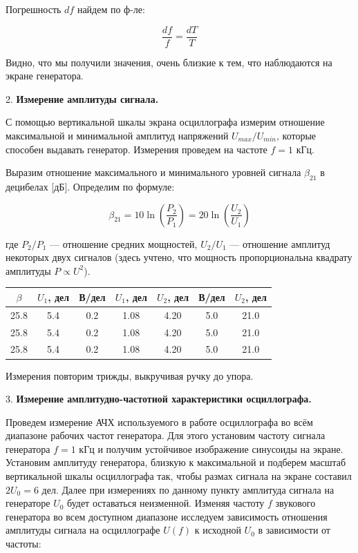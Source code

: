 \documentclass[14pt]{article}
\begin{document}
Погрешность $df$ найдем по ф-ле: 

$$\frac{df}{f} = \frac{dT}{T}$$

Видно, что мы получили значения, очень близкие к тем, что наблюдаются на экране генератора.

\vspace{0.5cm}
2. \textbf{Измерение амплитуды сигнала.} 

С помощью вертикальной шкалы экрана осциллографа измерим отношение максимальной и минимальной амплитуд напряжений $U_{max}/U_{min}$, которые способен выдавать генератор. Измерения проведем на частоте $f = 1$ кГц.

Выразим отношение максимального и минимального уровней сигнала $\beta_{21}$ в децибелах [дБ]. Определим по формуле:

$$\beta_{21} = 10 \ln\left(\frac{P_2}{P_1}\right) = 20 \ln\left(\frac{U_2}{U_1}\right)$$

где $P_2/P_1$ — отношение средних мощностей, $U_2/U_1$ — отношение амплитуд некоторых двух сигналов (здесь учтено, что мощность пропорциональна квадрату амплитуды $P \propto U^2$).


\begin{center}
\begin{tabular}{|c|c|c|c|c|c|c|}
\hline
$\beta$		&	$U_1$, дел	&	В/дел	&	$U_1$, дел	&	$U_2$, дел	&	В/дел	&	$U_2$, дел\\
\hline
25.8		&	5.4			&	0.2		&	1.08		&	4.20		&	5.0		&	21.0\\
\hline
25.8		&	5.4			&	0.2		&	1.08		&	4.20		&	5.0		&	21.0\\
\hline
25.8		&	5.4			&	0.2		&	1.08		&	4.20		&	5.0		&	21.0\\
\hline
\end{tabular}
\end{center}

Измерения повторим трижды, выкручивая ручку до упора.

\vspace{0.5cm}
3. \textbf{Измерение амплитудно-частотной характеристики осциллографа.} 

Проведем измерение АЧХ используемого в работе осциллографа во всём диапазоне рабочих частот генератора. Для этого установим частоту сигнала генератора $f = 1$ кГц и получим устойчивое изображение синусоиды на экране. Установим амплитуду генератора, близкую к максимальной и подберем масштаб вертикальной шкалы осциллографа так, чтобы размах сигнала на экране составил $2U_0 = 6$ дел. Далее при измерениях по данному пункту амплитуда сигнала на генераторе $U_0$ будет оставаться неизменной. Изменяя частоту $f$ звукового генератора во всем доступном диапазоне исследуем зависимость отношения амплитуды сигнала на осциллографе $U(f)$ к исходной $U_0$ в зависимости от частоты:
\end{document}
